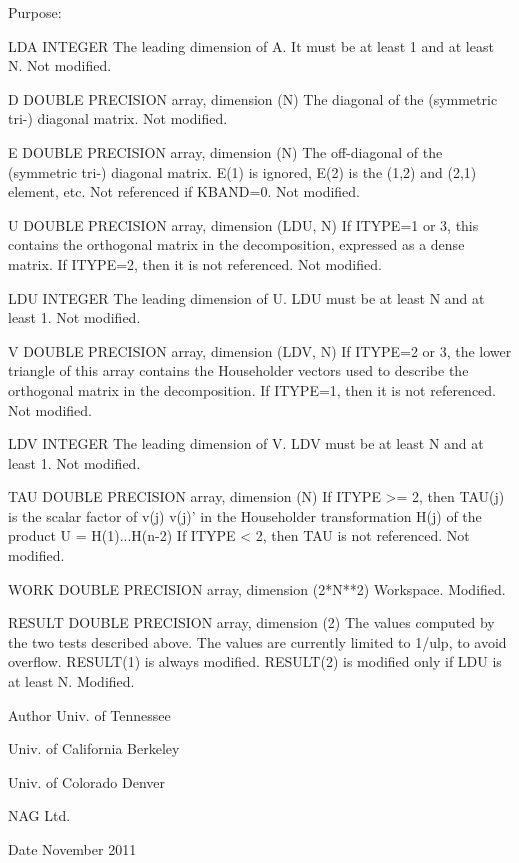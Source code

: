 \begin{DoxyParagraph}{Purpose\+: }
\begin{DoxyVerb}
  LDA     INTEGER
          The leading dimension of A.  It must be at least 1
          and at least N.
          Not modified.

  D       DOUBLE PRECISION array, dimension (N)
          The diagonal of the (symmetric tri-) diagonal matrix.
          Not modified.

  E       DOUBLE PRECISION array, dimension (N)
          The off-diagonal of the (symmetric tri-) diagonal matrix.
          E(1) is ignored, E(2) is the (1,2) and (2,1) element, etc.
          Not referenced if KBAND=0.
          Not modified.

  U       DOUBLE PRECISION array, dimension (LDU, N)
          If ITYPE=1 or 3, this contains the orthogonal matrix in
          the decomposition, expressed as a dense matrix.  If ITYPE=2,
          then it is not referenced.
          Not modified.

  LDU     INTEGER
          The leading dimension of U.  LDU must be at least N and
          at least 1.
          Not modified.

  V       DOUBLE PRECISION array, dimension (LDV, N)
          If ITYPE=2 or 3, the lower triangle of this array contains
          the Householder vectors used to describe the orthogonal
          matrix in the decomposition.  If ITYPE=1, then it is not
          referenced.
          Not modified.

  LDV     INTEGER
          The leading dimension of V.  LDV must be at least N and
          at least 1.
          Not modified.

  TAU     DOUBLE PRECISION array, dimension (N)
          If ITYPE >= 2, then TAU(j) is the scalar factor of
          v(j) v(j)' in the Householder transformation H(j) of
          the product  U = H(1)...H(n-2)
          If ITYPE < 2, then TAU is not referenced.
          Not modified.

  WORK    DOUBLE PRECISION array, dimension (2*N**2)
          Workspace.
          Modified.

  RESULT  DOUBLE PRECISION array, dimension (2)
          The values computed by the two tests described above.  The
          values are currently limited to 1/ulp, to avoid overflow.
          RESULT(1) is always modified.  RESULT(2) is modified only
          if LDU is at least N.
          Modified.\end{DoxyVerb}
 
\end{DoxyParagraph}
\begin{DoxyAuthor}{Author}
Univ. of Tennessee 

Univ. of California Berkeley 

Univ. of Colorado Denver 

N\+A\+G Ltd. 
\end{DoxyAuthor}
\begin{DoxyDate}{Date}
November 2011 
\end{DoxyDate}
